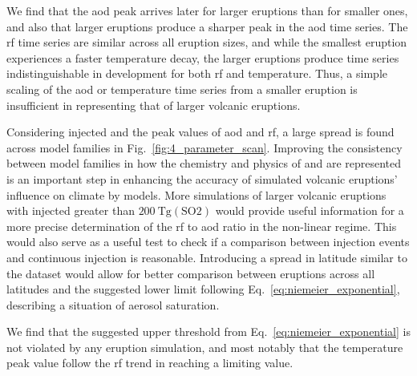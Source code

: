 \documentclass{ametsocV6.1}
\newcommand{\iso}[1][i]{{#1}njected \ce{SO2}}
\begin{document}
We find that the \gls{aod} peak arrives later for larger eruptions than for smaller
ones, and also that larger eruptions produce a sharper peak in the \gls{aod} time
series. The \gls{rf} time series are similar across all eruption sizes, and while the
smallest eruption experiences a faster temperature decay, the larger eruptions produce
time series indistinguishable in development for both \gls{rf} and temperature. Thus, a
simple scaling of the \gls{aod} or temperature time series from a smaller eruption is
insufficient in representing that of larger volcanic eruptions.

Considering \iso{} and the peak values of \gls{aod} and \gls{rf}, a large spread is
found across model families in Fig.~\ref{fig:4_parameter_scan}. Improving the
consistency between model families in how the chemistry and physics of  and
 are represented is an important step in enhancing the accuracy of simulated
volcanic eruptions' influence on climate by models. More simulations of larger volcanic
eruptions with \iso{} greater than \(\SI{200}{\tera\gram(\mathrm{SO2})}\) would provide
useful information for a more precise determination of the \gls{rf} to \gls{aod} ratio
in the non-linear regime. This would also serve as a useful test to check if a
comparison between  injection events and continuous  injection is
reasonable. Introducing a spread in latitude similar to the \citet{marshall2020dataset}
dataset would allow for better comparison between eruptions across all latitudes and the
suggested lower limit following Eq.~\ref{eq:niemeier_exponential}, describing a
situation of aerosol saturation.

We find that the suggested upper threshold from Eq.~\ref{eq:niemeier_exponential} is not
violated by any eruption simulation, and most notably that the temperature peak value
follow the \gls{rf} trend in reaching a limiting value.

\clearpage
\acknowledgments{}
\end{document}
